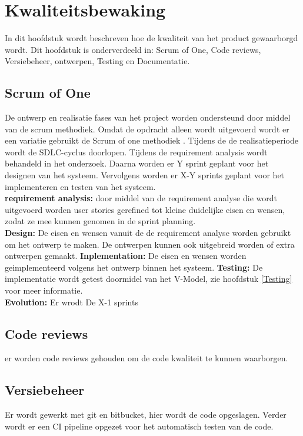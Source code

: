 \chapter{Kwaliteitsbewaking}
In dit hoofdstuk wordt beschreven hoe de kwaliteit van het product gewaarborgd wordt.
Dit hoofdstuk is onderverdeeld in: Scrum of One, Code reviews, Versiebeheer, ontwerpen, Testing en Documentatie.
\section{Scrum of One}
De ontwerp en realisatie fases van het project worden ondersteund door middel van de scrum methodiek.
Omdat de opdracht alleen wordt uitgevoerd wordt er een variatie gebruikt de Scrum of one methodiek \Parencite{ScrumOfOne}.
\whitespace
Tijdens de de realisatieperiode wordt de SDLC-cyclus doorlopen.
Tijdens de requirement analysis wordt behandeld in het onderzoek. 
Daarna worden er Y sprint geplant voor het designen van het systeem.
Vervolgens worden er X-Y sprints geplant voor het implementeren en testen van het systeem. \\
\textbf{requirement analysis:} door middel van de requirement analyse die wordt uitgevoerd worden user stories gerefined tot kleine duidelijke eisen en wensen, zodat ze mee kunnen genomen in de sprint planning.\\
\textbf{Design:} De eisen en wensen vanuit de de requirement analyse worden gebruikt om het ontwerp te maken.
De ontwerpen kunnen ook uitgebreid worden of extra ontwerpen gemaakt.
\textbf{Inplementation:}
De eisen en wensen worden geimplementeerd volgens het ontwerp binnen het systeem.
\textbf{Testing:} De implementatie wordt getest doormidel van het V-Model, zie hoofdstuk \ref{Testing} voor meer informatie.\\
\textbf{Evolution:} Er wrodt
De X-1 sprints 
\section{Code reviews}
er worden code reviews gehouden om de code kwaliteit te kunnen waarborgen.
\section{Versiebeheer}
Er wordt gewerkt met git en bitbucket, hier wordt de code opgeslagen. Verder wordt er een CI pipeline opgezet voor het automatisch testen van de code.
